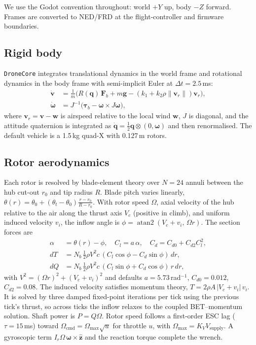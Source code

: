 \documentclass{ieeeaccess}
\begin{document}
We use the Godot convention throughout: world $+Y$ up, body $-Z$ forward. Frames
are converted to NED/FRD at the flight-controller and firmware boundaries.

\subsection{Rigid body}
\texttt{DroneCore} integrates translational dynamics in the world frame and
rotational dynamics in the body frame with semi-implicit Euler at
$\Delta t=2.5$\,ms:
\begin{align}
\dot{\mathbf v} &= \tfrac{1}{m}\big(R(\mathbf q)\,\mathbf F_b + m\mathbf g - (k_1 + k_2\rho\|\mathbf v_r\|)\mathbf v_r\big),\\
\dot{\boldsymbol\omega} &= J^{-1}\big(\boldsymbol\tau_b - \boldsymbol\omega\times J\boldsymbol\omega\big),
\end{align}
where $\mathbf v_r=\mathbf v-\mathbf w$ is airspeed relative to the local wind
$\mathbf w$, $J$ is diagonal, and the attitude quaternion is integrated as
$\dot{\mathbf q}=\tfrac12\mathbf q\otimes(0,\boldsymbol\omega)$ and then
renormalised. The default vehicle is a 1.5\,kg quad-X with 0.127\,m rotors.

\subsection{Rotor aerodynamics}
Each rotor is resolved by blade-element theory over $N=24$ annuli between the
hub cut-out $r_0$ and tip radius $R$. Blade pitch varies linearly,
$\theta(r)=\theta_0+(\theta_t-\theta_0)\frac{r-r_0}{R-r_0}$. With rotor speed
$\Omega$, axial velocity of the hub relative to the air along the thrust axis
$V_c$ (positive in climb), and uniform induced velocity $v_i$, the inflow angle
is $\phi=\operatorname{atan2}(V_c+v_i,\,\Omega r)$. The section forces are
\begin{align}
\alpha &= \theta(r)-\phi,\quad C_l = a\,\alpha,\quad C_d=C_{d0}+C_{d2}C_l^2,\\
dT &= N_b\, \tfrac12\rho V^2 c\,(C_l\cos\phi - C_d\sin\phi)\,dr,\\
dQ &= N_b\, \tfrac12\rho V^2 c\,(C_l\sin\phi + C_d\cos\phi)\,r\,dr,
\end{align}
with $V^2=(\Omega r)^2+(V_c+v_i)^2$ and defaults $a=5.73$\,rad$^{-1}$,
$C_{d0}=0.012$, $C_{d2}=0.08$. The induced velocity satisfies momentum theory,
$T=2\rho A\,|V_c+v_i|\,v_i$. It is solved by three damped fixed-point
iterations per tick using the previous tick's thrust, so across ticks the
inflow relaxes to the coupled BET--momentum solution. Shaft power is
$P=Q\Omega$. Rotor speed follows a first-order ESC lag
($\tau=15$\,ms) toward $\Omega_\text{cmd}=\Omega_\text{max}\sqrt{u}$ for throttle
$u$, with $\Omega_\text{max}=K_V V_\text{supply}$. A gyroscopic term
$I_r\Omega\,\boldsymbol\omega\times\hat{\mathbf z}$ and the reaction torque
complete the wrench.
\end{document}
